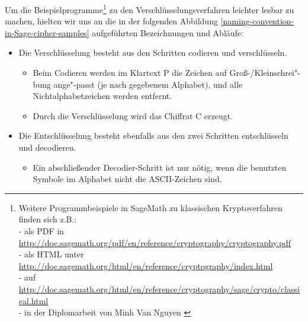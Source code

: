 \begin{refsegment}
Um die Beispielprogramme\footnote{%
     Weitere Programmbeispiele in SageMath zu klassischen Kryptoverfahren finden
     sich z.B.:\\
     - als PDF in \url{http://doc.sagemath.org/pdf/en/reference/cryptography/cryptography.pdf}\\
     - als HTML unter \url{http://doc.sagemath.org/html/en/reference/cryptography/index.html}\\
     - auf \url{http://doc.sagemath.org/html/en/reference/cryptography/sage/crypto/classical.html}\\
     - in der Diplomarbeit von Minh Van Nguyen \cite{Nguyen2009b}
     }
zu den Verschlüsselungsver\-fah\-ren leichter lesbar zu machen, hielten wir uns
an die in der folgenden Abbildung \ref{naming-convention-in-Sage-cipher-samples}
aufgeführten Bezeichnungen und Abläufe:
\begin{itemize}
  \item Die Verschlüsselung besteht aus den Schritten codieren und
  verschlüsseln.
  \begin{itemize}
    \item Beim Codieren werden im Klartext P die Zeichen auf
          Groß-/Kleinschrei"-bung ange"-passt (je nach gegebenem Alphabet),
          und alle Nichtalphabetzeichen werden entfernt.
    \item Durch die Verschlüsselung wird das Chiffrat C erzeugt.
  \end{itemize}
  \item Die Entschlüsselung besteht ebenfalls aus den zwei Schritten entschlüsseln und decodieren.
  \begin{itemize}
    \item Ein abschließender Decodier-Schritt ist nur nötig, wenn die benutzten
          Symbole im Alphabet nicht die ASCII-Zeichen sind.
  \end{itemize}
\end{itemize}


\end{refsegment}
